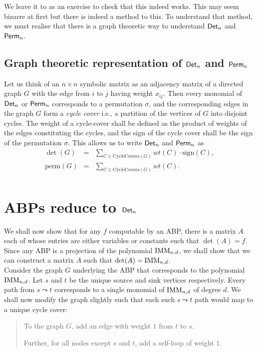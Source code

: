 We leave it to as an exercise to check that this indeed works. This may seem bizarre at first but there is indeed a
method to this. To understand that method, we must realise that there is a graph theoretic way to understand $\operatorname{\mathsf{Det}}_n$ and $\operatorname{\mathsf{Perm}}_n$. 

\subsection*{Graph theoretic representation of $\operatorname{\mathsf{Det}}_n$ and $\operatorname{\mathsf{Perm}}_n$}

Let us think of an $n\times n$ symbolic matrix as an adjacency matrix of a directed graph $G$ with the edge from $i$ to $j$ having weight $x_{ij}$. 
Then every monomial of $\operatorname{\mathsf{Det}}_n$ or $\operatorname{\mathsf{Perm}}_n$ corresponds to a permutation $\sigma$, and the corresponding edges in the graph $G$ form a \emph{cycle cover} i.e., a partition of the vertices of $G$ into disjoint cycles. 
The weight of a cycle-cover shall be defined as the product of weights of the edges constituting the cycles, and the sign of the cycle cover shall be the sign of the permutation $\sigma$. 
This allows us to write $\operatorname{\mathsf{Det}}_n$ and $\operatorname{\mathsf{Perm}}_n$ as
\begin{eqnarray*}
\det(G) & = & \sum_{C\in \mathrm{CycleCovers}(G)} wt(C) \cdot \mathrm{sign}(C),\\
\mathrm{perm}(G) & = & \sum_{C\in \mathrm{CycleCovers}(G)} wt(C).\\
\end{eqnarray*}

\section{ABPs reduce to $\operatorname{\mathsf{Det}}_n$}

We shall now show that for any $f$ computable by an ABP, there is a matrix  $A$ each of whose entries are either variables or constants such that $\det(A) = f$. 
Since any ABP is a projection of the polynomial $\operatorname{\mathrm{IMM}}_{n,d}$, we shall show that we can construct a matrix  $A$  such that $\det(A) = \operatorname{\mathrm{IMM}}_{n,d}$. \\

Consider the graph $G$ underlying the ABP that corresponds to the polynomial $\operatorname{\mathrm{IMM}}_{n,d}$. 
Let $s$ and $t$ be the unique source and sink vertices respectively. 
Every path from $s\leadsto t$ corresponds to a single monomial of $\operatorname{\mathrm{IMM}}_{n,d}$ of degree $d$. 
We shall now modify the graph slightly such that each such $s\leadsto t$ path would map to a unique cycle cover:

\begin{quote}
  To the graph $G$, add an edge with weight $1$ from $t$ to $s$. 

  Further, for all nodes except $s$ and $t$, add a self-loop of weight $1$. 
\end{quote}

